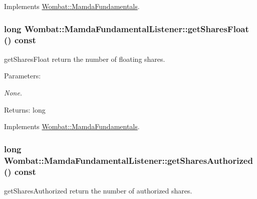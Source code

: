 Implements \hyperlink{classWombat_1_1MamdaFundamentals_47890caba7011068a8e2dc9222e883f4}{Wombat::Mamda\-Fundamentals}.\hypertarget{classWombat_1_1MamdaFundamentalListener_4a4693aa809d7affdaeda70f34f002d7}{
\subsubsection[getSharesFloat]{\setlength{\rightskip}{0pt plus 5cm}long Wombat::Mamda\-Fundamental\-Listener::get\-Shares\-Float () const}}
\label{classWombat_1_1MamdaFundamentalListener_4a4693aa809d7affdaeda70f34f002d7}


get\-Shares\-Float return the number of floating shares. 

\begin{Desc}
\item[Parameters:]
\begin{description}
\item[{\em None.}]\end{description}
\end{Desc}
\begin{Desc}
\item[Returns:]long\end{Desc}


Implements \hyperlink{classWombat_1_1MamdaFundamentals_64a2fc82594149b801ae5723479df55d}{Wombat::Mamda\-Fundamentals}.\hypertarget{classWombat_1_1MamdaFundamentalListener_271ea50e95b80126e461612c0ab7ed09}{
\subsubsection[getSharesAuthorized]{\setlength{\rightskip}{0pt plus 5cm}long Wombat::Mamda\-Fundamental\-Listener::get\-Shares\-Authorized () const}}
\label{classWombat_1_1MamdaFundamentalListener_271ea50e95b80126e461612c0ab7ed09}


get\-Shares\-Authorized return the number of authorized shares. 

